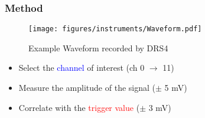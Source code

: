\begin{frame} [fragile]
\small
	\frametitle{Method}
    		\begin{figure}
		 \centering
			\texttt{[image: figures/instruments/Waveform.pdf]}
			\caption{Example Waveform recorded by DRS4}
		\end{figure}
	\begin{itemize}
		\item Select the \textcolor{blue}{channel} of interest (ch 0 $\longrightarrow$ 11)
		\item Measure the amplitude of the signal ($\pm$ 5 mV)
		\item Correlate with the \textcolor{red}{trigger value}  ($\pm$ 3 mV)
	\end{itemize}  
\end{frame}

